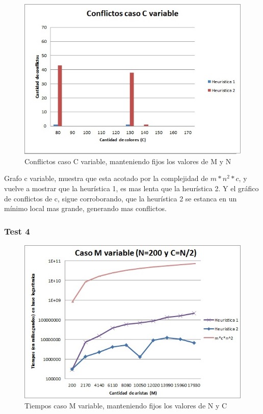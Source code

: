 \begin{figure}[H]
  \begin{center}
      \includegraphics[scale=0.75]{../Ejercicio4CVariableConflictos.jpg}
  \end{center}
  \caption{Conflictos caso C variable, manteniendo fijos los valores de M y N}
\end{figure}

Grafo c variable, muestra que esta acotado por la complejidad de $m*n^2*c$, y vuelve a mostrar que la heurística 1, es mas lenta que la heurística 2. Y el gráfico de conflictos de c, sigue corroborando, que la heurística 2 se estanca en un mínimo local mas grande, generando mas conflictos.

\subsubsection{Test 4}


\begin{figure}[H]
  \begin{center}
      \includegraphics[scale=0.75]{../Ejercicio4MVariable.jpg}
  \end{center}
  \caption{Tiempos caso M variable, manteniendo fijos los valores de N y C}
\end{figure}

